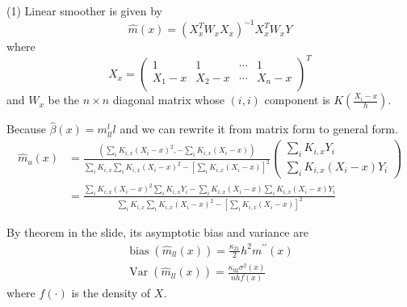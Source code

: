 \begin{solution}
    (1) Linear smoother is given by 
    \begin{equation*}
        \hat{m}(x) = (X_x^T W_x X_x)^{-1} X_x^T W_x Y
    \end{equation*}
    where 
    \begin{equation*}
        X_x 
        = 
        \begin{pmatrix}
            1      & 1       & \cdots & 1       \\
            X_1 -x & X_2 - x & \cdots & X_n - x \\
        \end{pmatrix}^T
    \end{equation*}
    and $W_x$ be the $n\times n$ diagonal matrix whose $(i,i)$ component is $K\left( \frac{X_i - x}{h}\right)$.

    Because $\hat{\beta}(x) = m_{ll}^ll$ and we can rewrite it from matrix form to general form. 
    \begin{equation}
       \begin{aligned} 
            \hat{m}_{u}(x) 
            & =\frac{\left(\sum_{i} K_{i, x}\left(X_{i}-x\right)^{2},-\sum_{i} K_{i, x}\left(X_{i}-x\right)\right)}{\sum_{i} K_{i, x} \sum_{i} K_{i, x}\left(X_{i}-x\right)^{2}-\left[\sum_{i} K_{i, x}\left(X_{i}-x\right)\right]^{2}}
                \left(
                    \begin{array}{c}
                        {\sum_{i} K_{i, x} Y_{i}} \\ 
                        {\sum_{i} K_{i, x}\left(X_{i}-x\right) Y_{i}}
                    \end{array}
                \right) \\ 
            &=\frac{\sum_{i} K_{i, x}\left(X_{i}-x\right)^{2} \sum_{i} K_{i, x} Y_{i}-\sum_{i} K_{i, x}\left(X_{i}-x\right) \sum_{i} K_{i, x}\left(X_{i}-x\right) Y_{i}}{\sum_{i} K_{i, x} \sum_{i} K_{i, x}\left(X_{i}-x\right)^{2}-\left[\sum_{i} K_{i, x}\left(X_{i}-x\right)\right]^{2}} 
        \end{aligned}
    \end{equation}

    By theorem in the slide, its asymptotic bias and variance are
    \begin{equation}
        \begin{array}{l}
            {\operatorname{bias}\left(\hat{m}_{l l}(x)\right)=\frac{\kappa_{21}}{2} h^{2} m^{\prime \prime}(x)} \\ {\operatorname{Var}\left(\hat{m}_{l l}(x)\right)=\frac{\kappa_{02} \sigma^{2}(x)}{n h f(x)}}
        \end{array}
    \end{equation}
    where $f(\cdot)$ is the density of $X$.


\end{solution}
